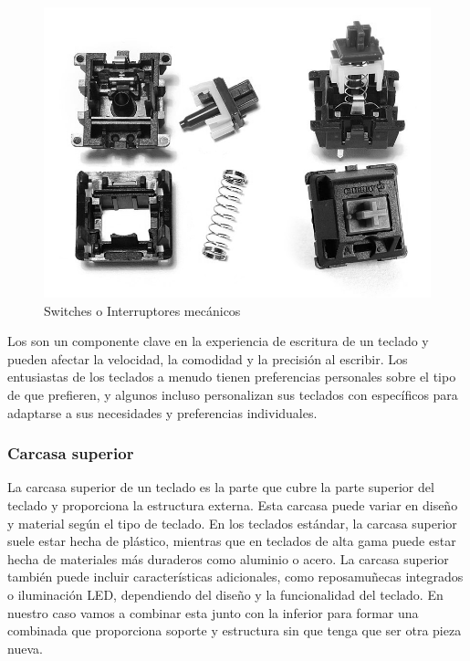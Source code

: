 \begin{figure}[H]
    \centering
    \includegraphics[width=1\textwidth]{imagenes/Capitulos/Cap03/Switches.png}
    \caption{Switches o Interruptores mecánicos \cite{SwitchesImageSource}}
    \label{fig:Switches}
\end{figure}

Los  son un componente clave en la experiencia de escritura de un teclado y pueden afectar la velocidad, la comodidad y la precisión al escribir. Los entusiastas de los teclados a menudo tienen preferencias personales sobre el tipo de  que prefieren, y algunos incluso personalizan sus teclados con  específicos para adaptarse a sus necesidades y preferencias individuales.
\newpage
\subsubsection{Carcasa superior}

La carcasa superior de un teclado es la parte que cubre la parte superior del teclado y proporciona la estructura externa. Esta carcasa puede variar en diseño y material según el tipo de teclado. En los teclados estándar, la carcasa superior suele estar hecha de plástico, mientras que en teclados de alta gama puede estar hecha de materiales más duraderos como aluminio o acero. La carcasa superior también puede incluir características adicionales, como reposamuñecas integrados o iluminación \gls{LED}, dependiendo del diseño y la funcionalidad del teclado. En nuestro caso vamos a combinar esta junto con la inferior para formar una combinada que proporciona soporte y estructura sin que tenga que ser otra pieza nueva.

